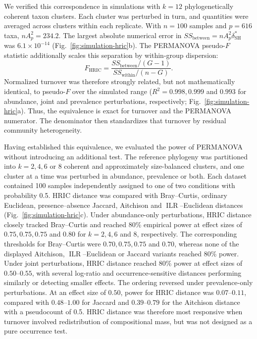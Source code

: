 We verified this correspondence in simulations with \(k=12\)
phylogenetically coherent taxon clusters. Each cluster was perturbed in turn,
and quantities were averaged across clusters within each replicate. With
\(n=100\) samples and \(p=616\) taxa, \(nA_p^2=234.2\). The largest absolute
numerical error in
\(SS_{\mathrm{between}}=nA_p^2\delta_{\mathrm{SH}}^*\) was
\(6.1\times10^{-14}\) (Fig.~\ref{fig:simulation-hric}b). The PERMANOVA
pseudo-\(F\) statistic additionally scales this separation by within-group
dispersion:
\[
F_{\mathrm{HRIC}}
  =
  \frac{SS_{\mathrm{between}}/(G-1)}
       {SS_{\mathrm{within}}/(n-G)}.
\]
Normalized turnover was therefore strongly related, but not mathematically
identical, to pseudo-\(F\) over the simulated range
(\(R^2=0.998,0.999\) and \(0.993\) for abundance, joint and prevalence
perturbations, respectively; Fig.~\ref{fig:simulation-hric}a). Thus, the
equivalence is exact for turnover and the PERMANOVA numerator. The denominator
then standardizes that turnover by residual community heterogeneity.

Having established this equivalence, we evaluated the power of PERMANOVA
without introducing an additional test. The reference phylogeny was
partitioned into \(k=2,4,6\) or 8 coherent and approximately size-balanced
clusters, and one cluster at a time was perturbed in abundance, prevalence or
both. Each dataset contained 100 samples independently assigned to one of two
conditions with probability 0.5. HRIC distance was compared with
Bray--Curtis, ordinary Euclidean, presence--absence Jaccard, Aitchison and
\(\operatorname{ILR}\)--Euclidean distances (Fig.~\ref{fig:simulation-hric}c).
Under abundance-only perturbations, HRIC distance closely tracked
Bray--Curtis and reached 80\% empirical power at effect sizes of
\(0.75,0.75,0.75\) and \(0.80\) for \(k=2,4,6\) and 8, respectively.
The corresponding thresholds for Bray--Curtis were
\(0.70,0.75,0.75\) and \(0.70\), whereas none of the displayed Aitchison,
\(\operatorname{ILR}\)--Euclidean or Jaccard variants reached 80\% power.
Under joint perturbations, HRIC distance reached 80\% power at effect sizes of
\(0.50\)--\(0.55\), with several log-ratio and occurrence-sensitive
distances performing similarly or detecting smaller effects. The ordering
reversed under prevalence-only perturbations. At an effect size of \(0.50\),
power for HRIC distance was \(0.07\)--\(0.11\), compared with
\(0.48\)--\(1.00\) for Jaccard and \(0.39\)--\(0.79\) for the Aitchison
distance with a pseudocount of 0.5. HRIC distance was therefore most
responsive when turnover involved redistribution of compositional mass, but
was not designed as a pure occurrence test.

